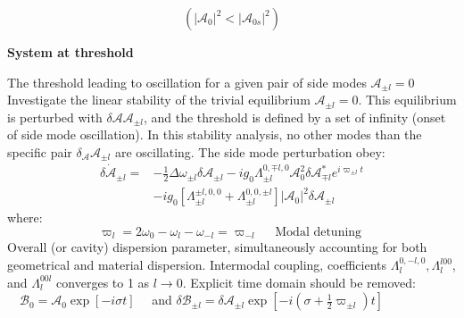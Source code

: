 \documentclass[main.tex]{subfiles}
\begin{document}
$$
\left(\left|\mathcal{A}_0\right|^2<\left|\mathcal{A}_{0 s}\right|^2\right)
$$

\textbf{System at threshold}

The threshold leading to oscillation for a given pair of side modes $\mathcal{A}_{\pm l}=0$ Investigate the linear stability of the trivial equilibrium $\mathcal{A}_{\pm l}=0$. This equilibrium is perturbed with $\delta \mathcal{A} \mathcal{A}_{\pm l}$, and the threshold is defined by a set of infinity (onset of side mode oscillation).
In this stability analysis, no other modes than the specific pair $\delta_{\mathcal{A}} \mathcal{A}_{\pm l}$ are oscillating.
The side mode perturbation obey:
$$
\begin{aligned}
\delta \dot{\mathcal{A}}_{\pm l}=&-\frac{1}{2} \Delta \omega_{\pm l} \delta \mathcal{A}_{\pm l}-i g_0 \Lambda_{\pm l}^{0, \mp l, 0} \mathcal{A}_0^2 \delta \mathcal{A}_{\mp l}^* e^{i \varpi_{\pm l} t} \\
&-i g_0\left[\Lambda_{\pm l}^{\pm l, 0,0}+\Lambda_{\pm l}^{0,0, \pm l}\right]\left|\mathcal{A}_0\right|^2 \delta \mathcal{A}_{\pm l}
\end{aligned}
$$
where:
$$
\varpi_l=2 \omega_0-\omega_l-\omega_{-l}=\varpi_{-l} \quad \text { Modal detuning }
$$
Overall (or cavity) dispersion parameter, simultaneously accounting for both geometrical and material dispersion. Intermodal coupling, coefficients $\Lambda_l^{0,-l, 0}, \Lambda_l^{l 00}$, and $\Lambda_l^{00 l}$ converges to 1 as $l \rightarrow 0$.
Explicit time domain should be removed: $\quad \mathcal{B}_0=\mathcal{A}_0 \exp [-i \sigma t] \quad$ and $\delta \mathcal{B}_{\pm l}=\delta \mathcal{A}_{\pm l} \exp \left[-i\left(\sigma+\frac{1}{2} \varpi_{\pm l}\right) t\right]$
\end{document}

